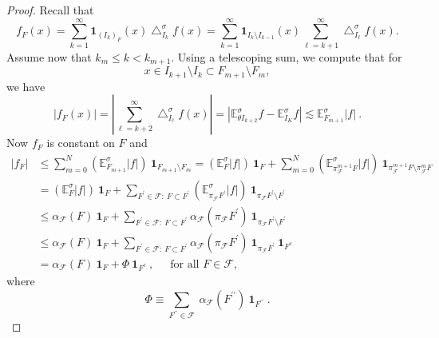 \documentclass{amsart}%
\theoremstyle{plain}
\numberwithin{equation}{section}
\begin{document}
\begin{proof}
Recall that%
\[
f_{F}\left(  x\right)  =\sum_{k=1}^{\infty}\mathbf{1}_{\left(  I_{k}\right)
_{F}}\left(  x\right)  \bigtriangleup_{I_{k}}^{\sigma}f\left(  x\right)
=\sum_{k=1}^{\infty}\mathbf{1}_{I_{k}\setminus I_{k-1}}\left(  x\right)
\sum_{\ell=k+1}^{\infty}\bigtriangleup_{I_{\ell}}^{\sigma}f\left(  x\right)  .
\]
Assume now that $k_{m}\leq k<k_{m+1}$. Using a telescoping sum, we compute
that for
\[
x\in I_{k+1}\setminus I_{k}\subset F_{m+1}\setminus F_{m},
\]
we have
\[
\left\vert f_{F}\left(  x\right)  \right\vert =\left\vert \sum_{\ell
=k+2}^{\infty}\bigtriangleup_{I_{\ell}}^{\sigma}f\left(  x\right)  \right\vert
=\left\vert \mathbb{E}_{\theta I_{k+2}}^{\sigma}f-\mathbb{E}_{I_{K}}^{\sigma
}f\right\vert \lesssim\mathbb{E}_{F_{m+1}}^{\sigma}\left\vert f\right\vert \ .
\]
Now $f_{F}$ is constant on $F$ and%
\begin{align*}
\left\vert f_{F}\right\vert  & \leq\sum_{m=0}^{N}\left(  \mathbb{E}_{F_{m+1}%
}^{\sigma}\left\vert f\right\vert \right)  \ \mathbf{1}_{F_{m+1}\setminus
F_{m}}=\left(  \mathbb{E}_{F}^{\sigma}\left\vert f\right\vert \right)
\ \mathbf{1}_{F}+\sum_{m=0}^{N}\left(  \mathbb{E}_{\pi_{\mathcal{F}}^{m+1}%
F}^{\sigma}\left\vert f\right\vert \right)  \ \mathbf{1}_{\pi_{\mathcal{F}%
}^{m+1}F\setminus\pi_{\mathcal{F}}^{m}F}\\
& =\left(  \mathbb{E}_{F}^{\sigma}\left\vert f\right\vert \right)
\ \mathbf{1}_{F}+\sum_{F^{\prime}\in\mathcal{F}:\ F\subset F^{\prime}}\left(
\mathbb{E}_{\pi_{\mathcal{F}}F^{\prime}}^{\sigma}\left\vert f\right\vert
\right)  \ \mathbf{1}_{\pi_{\mathcal{F}}F^{\prime}\setminus F^{\prime}}\\
& \leq\alpha_{\mathcal{F}}\left(  F\right)  \ \mathbf{1}_{F}+\sum_{F^{\prime
}\in\mathcal{F}:\ F\subset F^{\prime}}\alpha_{\mathcal{F}}\left(
\pi_{\mathcal{F}}F^{\prime}\right)  \ \mathbf{1}_{\pi_{\mathcal{F}}F^{\prime
}\setminus F^{\prime}}\\
& \leq\alpha_{\mathcal{F}}\left(  F\right)  \ \mathbf{1}_{F}+\sum_{F^{\prime
}\in\mathcal{F}:\ F\subset F^{\prime}}\alpha_{\mathcal{F}}\left(
\pi_{\mathcal{F}}F^{\prime}\right)  \ \mathbf{1}_{\pi_{\mathcal{F}}F^{\prime}%
}\ \mathbf{1}_{F^{c}}\\
& =\alpha_{\mathcal{F}}\left(  F\right)  \ \mathbf{1}_{F}+\Phi\ \mathbf{1}%
_{F^{c}}\ ,\ \ \ \ \ \text{\ for all }F\in\mathcal{F},
\end{align*}
where%
\[
\Phi\equiv\sum_{F^{\prime\prime}\in\mathcal{F}}\ \alpha_{\mathcal{F}}\left(
F^{\prime\prime}\right)  \ \mathbf{1}_{F^{\prime\prime}}\ .
\]



\end{proof}
\end{document}
